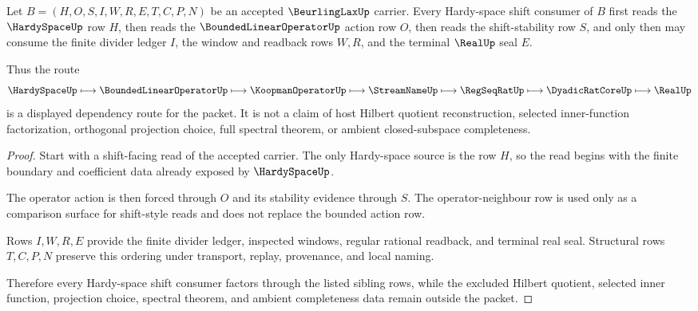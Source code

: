 \begin{theorem}
\label{thm:beurling-lax-hardy-shift-route}
Let $B=(H,O,S,I,W,R,E,T,C,P,N)$ be an accepted $\BeurlingLaxUp$ carrier. Every Hardy-space shift consumer of $B$ first reads the $\HardySpaceUp$ row $H$, then reads the $\BoundedLinearOperatorUp$ action row $O$, then reads the shift-stability row $S$, and only then may consume the finite divider ledger $I$, the window and readback rows $W,R$, and the terminal $\RealUp$ seal $E$.

Thus the route
$$
\HardySpaceUp \longmapsto \BoundedLinearOperatorUp \longmapsto \KoopmanOperatorUp \longmapsto \StreamNameUp \longmapsto \RegSeqRatUp \longmapsto \DyadicRatCoreUp \longmapsto \RealUp
$$
is a displayed dependency route for the packet. It is not a claim of host Hilbert quotient reconstruction, selected inner-function factorization, orthogonal projection choice, full spectral theorem, or ambient closed-subspace completeness.
\end{theorem}
\begin{proof}
Start with a shift-facing read of the accepted carrier. The only Hardy-space source is the row $H$, so the read begins with the finite boundary and coefficient data already exposed by $\HardySpaceUp$.

The operator action is then forced through $O$ and its stability evidence through $S$. The operator-neighbour row is used only as a comparison surface for shift-style reads and does not replace the bounded action row.

Rows $I,W,R,E$ provide the finite divider ledger, inspected windows, regular rational readback, and terminal real seal. Structural rows $T,C,P,N$ preserve this ordering under transport, replay, provenance, and local naming.

Therefore every Hardy-space shift consumer factors through the listed sibling rows, while the excluded Hilbert quotient, selected inner function, projection choice, spectral theorem, and ambient completeness data remain outside the packet.
\end{proof}



